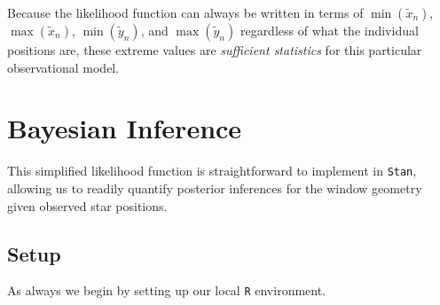 \documentclass[
  letterpaper,
  DIV=11,
  numbers=noendperiod]{scrartcl}
\begin{document}
Because the likelihood function can always be written in terms of
\(\min(\tilde{x}_{n})\), \(\max(\tilde{x}_{n})\),
\(\min(\tilde{y}_{n})\), and \(\max(\tilde{y}_{n})\) regardless of what
the individual positions are, these extreme values are \emph{sufficient
statistics} for this particular observational model.

\section{Bayesian Inference}\label{bayesian-inference}

This simplified likelihood function is straightforward to implement in
\texttt{Stan}, allowing us to readily quantify posterior inferences for
the window geometry given observed star positions.

\subsection{Setup}\label{setup}

As always we begin by setting up our local \texttt{R} environment.
\end{document}
